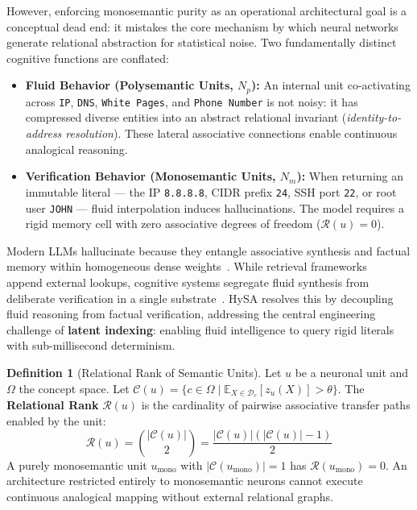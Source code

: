 \documentclass[10pt,twocolumn]{article}
\theoremstyle{definition}
\newtheorem{definition}{Definition}
\begin{document}
However, enforcing monosemantic purity as an operational architectural goal is a conceptual dead end: it mistakes the core mechanism by which neural networks generate relational abstraction for statistical noise. Two fundamentally distinct cognitive functions are conflated:
\begin{itemize}[leftmargin=*, itemsep=1.5pt, topsep=1.5pt]
    \item \textbf{Fluid Behavior (Polysemantic Units, $N_p$):} An internal unit co-activating across \texttt{IP}, \texttt{DNS}, \texttt{White Pages}, and \texttt{Phone Number} is not noisy: it has compressed diverse entities into an abstract relational invariant (\textit{identity-to-address resolution}). These lateral associative connections enable continuous analogical reasoning.
    \item \textbf{Verification Behavior (Monosemantic Units, $N_m$):} When returning an immutable literal — the IP \texttt{8.8.8.8}, CIDR prefix \texttt{24}, SSH port \texttt{22}, or root user \texttt{JOHN} — fluid interpolation induces hallucinations. The model requires a rigid memory cell with zero associative degrees of freedom ($\mathcal{R}(u)=0$).
\end{itemize}

Modern LLMs hallucinate because they entangle associative synthesis and factual memory within homogeneous dense weights~\cite{geva2021transformer, meng2022locating_rome}. While retrieval frameworks~\cite{khandelwal2020knn_lm} append external lookups, cognitive systems segregate fluid synthesis from deliberate verification in a single substrate~\cite{kahneman2011thinking}. HySA resolves this by decoupling fluid reasoning from factual verification, addressing the central engineering challenge of \textbf{latent indexing}: enabling fluid intelligence to query rigid literals with sub-millisecond determinism.

\begin{definition}[Relational Rank of Semantic Units]
Let $u$ be a neuronal unit and $\Omega$ the concept space. Let $\mathcal{C}(u) = \{c \in \Omega \mid \mathbb{E}_{X \in \mathcal{D}_c}[z_u(X)] > \theta\}$. The \textbf{Relational Rank} $\mathcal{R}(u)$ is the cardinality of pairwise associative transfer paths enabled by the unit:
\begin{equation}
    \mathcal{R}(u) = \binom{|\mathcal{C}(u)|}{2} = \frac{|\mathcal{C}(u)| (|\mathcal{C}(u)| - 1)}{2}
\end{equation}
A purely monosemantic unit $u_{\mathrm{mono}}$ with $|\mathcal{C}(u_{\mathrm{mono}})| = 1$ has $\mathcal{R}(u_{\mathrm{mono}}) = 0$. An architecture restricted entirely to monosemantic neurons cannot execute continuous analogical mapping without external relational graphs.
\end{definition}
\end{document}
